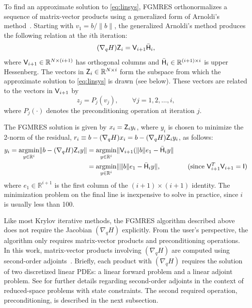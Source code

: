 To find an approximate solution to \eqref{eq:linsys}, FGMRES orthonormalizes a
sequence of matrix-vector products using a generalized form of Arnoldi's
method~\cite{saad:2003}.  Starting with $v_{1} = b/\|b\|$, the generalized
Arnoldi's method produces the following relation at the $i$th iteration:
\begin{equation}\label{eq:arnoldi}
  (\nabla_q H) \mathsf{Z}_{i} = \mathsf{V}_{i+1} \bar{\mathsf{H}}_{i},
\end{equation}
where $\mathsf{V}_{i+1} \in \mathbb{R}^{N\times (i+1)}$ has orthogonal columns and
$\bar{\mathsf{H}}_{i} \in \mathbb{R}^{(i+1)\times i}$ is upper Hessenberg.  The
vectors in $\mathsf{Z}_{i} \in \mathbb{R}^{N\times i}$ form the subspace from which
the approximate solution to \eqref{eq:linsys} is drawn (see below).  These
vectors are related to the vectors in $\mathsf{V}_{i+1}$ by
\begin{equation*}
  z_{j} = P_j(v_{j}), \qquad \forall j = 1,2,\ldots,i,
\end{equation*}
where $P_j(\cdot)$ denotes the preconditioning operation at iteration $j$.    

The FGMRES solution is given by $x_{i} = \mathsf{Z}_{i} y_{i}$, where $y_{i}$ is
chosen to minimize the 2-norm of the residual, $r_i \equiv b -  (\nabla_q H) x_i = b -  (\nabla_q H)\mathsf{Z}_i y_i$, as
follows:
\begin{align*}
  y_{i} = \underset{y \in \mathbb{R}^i}{\textrm{argmin}}
  \lVert b -  (\nabla_q H) \mathsf{Z}_i y \| 
  &= \underset{y \in \mathbb{R}^i}{\textrm{argmin}}
  \lVert \mathsf{V}_{i+1} (\|b\| e_1 - \bar{\mathsf{H}}_{i} y \| \\
  &= \underset{y \in \mathbb{R}^i}{\textrm{argmin}}
  \lVert \|b\| e_1 - \bar{\mathsf{H}}_{i} y \|,
  \qquad\qquad\text{(since $\mathsf{V}_{i+1}^T \mathsf{V}_{i+1} = \mathsf{I}$)}
\end{align*}
where $e_{1} \in \mathbb{R}^{i+1}$ is the first column of the $(i+1)\times(i+1)$
identity. The minimization problem on the final line is inexpensive to solve in
practice, since $i$ is usually less than 100.

Like most Krylov iterative methods, the FGMRES algorithm described above does
not require the Jacobian $(\nabla_q H)$ explicitly.  From the user's
perspective, the algorithm only requires matrix-vector products and
preconditioning operations.  In this work, matrix-vector products involving
$(\nabla_q H)$ are computed using second-order adjoints~\cite{wang:1992,
  hicken:inexact2014}.  Briefly, each product with $(\nabla_q H)$ requires the
solution of two discretized linear PDEs: a linear forward problem and a linear
adjoint problem.  See \cite{dener:scitech2015} for further details regarding
second-order adjoints in the context of reduced-space problems with state
constraints.  The second required operation, preconditioning, is described in
the next subsection.


